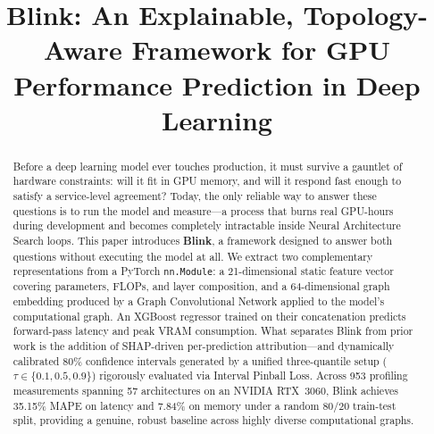 \documentclass[conference]{IEEEtran}
\begin{document}
\title{Blink: An Explainable, Topology-Aware Framework for GPU Performance Prediction in Deep Learning}

\author{
\and
{}
\and
{}
}

\maketitle

\begin{abstract}
Before a deep learning model ever touches production, it must survive a gauntlet of
hardware constraints: will it fit in GPU memory, and will it respond fast enough to
satisfy a service-level agreement? Today, the only reliable way to answer these
questions is to run the model and measure---a process that burns real GPU-hours during
development and becomes completely intractable inside Neural Architecture Search loops.
This paper introduces \textbf{Blink}, a framework designed to answer both questions
without executing the model at all. We extract two complementary representations from
a PyTorch \texttt{nn.Module}: a 21-dimensional static feature vector covering
parameters, FLOPs, and layer composition, and a 64-dimensional graph embedding
produced by a Graph Convolutional Network applied to the model's computational graph.
An XGBoost regressor trained on their concatenation predicts forward-pass latency and
peak VRAM consumption. What separates Blink from prior work is the addition of
SHAP-driven per-prediction attribution---and dynamically calibrated 80\% confidence
intervals generated by a unified three-quantile setup ($\tau \in \{0.1, 0.5, 0.9\}$)
rigorously evaluated via Interval Pinball Loss. Across 953 profiling measurements
spanning 57 architectures on an NVIDIA RTX~3060, Blink achieves 35.15\% MAPE on
latency and 7.84\% on memory under a random 80/20 train-test split, providing a 
genuine, robust baseline across highly diverse computational graphs.
\end{abstract}
\end{document}
